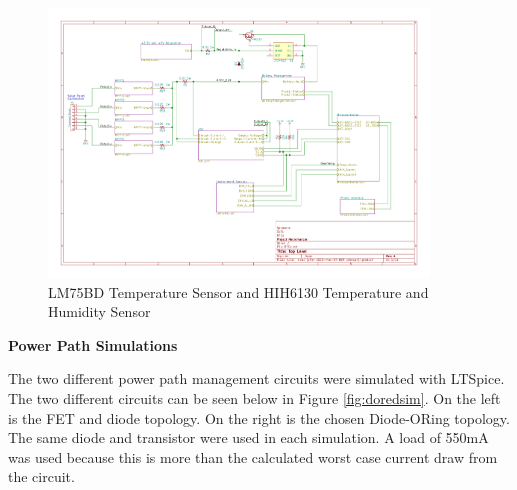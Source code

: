 \documentclass{article}
\numberwithin{figure}{section}
\numberwithin{equation}{section}
\begin{document}
{%

%
%

\begin{figure}[H]
	\centering
	\includegraphics[page=11,width=0.9\textwidth]{RFCxSchematics.pdf}
	\caption{LM75BD Temperature Sensor and HIH6130 Temperature and Humidity Sensor}
	\label{fig:schemp11}
\end{figure}

\newpage
\textbf{Power Path Simulations}

The two different power path management circuits were simulated with LTSpice. The two different circuits can be seen below in Figure \ref{fig:doredsim}. On the left is the FET and diode topology. On the right is the chosen Diode-ORing topology. The same diode and transistor were used in each simulation. A load of 550mA was used because this is more than the calculated worst case current draw from the circuit.

}
\end{document}
